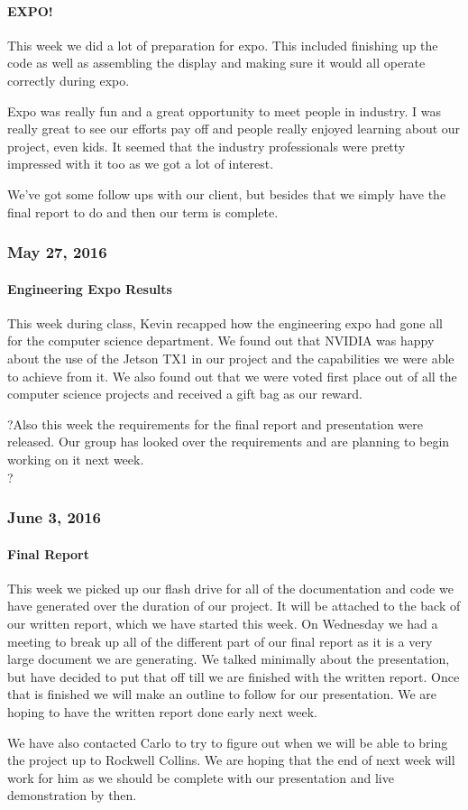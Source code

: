 \paragraph{EXPO!}
This week we did a lot of preparation for expo. This included finishing up the code as well as assembling the display and making sure it would all operate correctly during expo.
\par
Expo was really fun and a great opportunity to meet people in industry. I was really great to see our efforts pay off and people really enjoyed learning about our project, even kids. It seemed that the industry professionals were pretty impressed with it too as we got a lot of interest.
\par
We've got some follow ups with our client, but besides that we simply have the final report to do and then our term is complete.\\

\subsubsection{May 27, 2016}
\paragraph{Engineering Expo Results}
This week during class, Kevin recapped how the engineering expo had gone all for the computer science department. We found out that NVIDIA was happy about the use of the Jetson TX1 in our project and the capabilities we were able to achieve from it. We also found out that we were voted first place out of all the computer science projects and received a gift bag as our reward. 
\par
?Also this week the requirements for the final report and presentation were released. Our group has looked over the requirements and are planning to begin working on it next week.\\?

\subsubsection{June 3, 2016}
\paragraph{Final Report}
This week we picked up our flash drive for all of the documentation and code we have generated over the duration of our project. It will be attached to the back of our written report, which we have started this week. On Wednesday we had a meeting to break up all of the different part of our final report as it is a very large document we are generating. We talked minimally about the presentation, but have decided to put that off till we are finished with the written report. Once that is finished we will make an outline to follow for our presentation. We are hoping to have the written report done early next week.
\par
We have also contacted Carlo to try to figure out when we will be able to bring the project up to Rockwell Collins. We are hoping that the end of next week will work for him as we should be complete with our presentation and live demonstration by then.